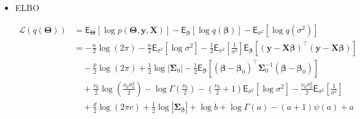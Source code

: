 \begin{appendix}
\begin{itemize}
where

\begin{equation}
a = \frac{n + \nu_0}{2}
\end{equation}

and

\begin{equation}
b = \frac{\nu_0 \sigma_0^2 + \mathsf{E}_{\bm{\beta}}\left[(\bm{y} - \bm{X} \bm{\beta})^{\top}
(\bm{y} - \bm{X} \bm{\beta})  \right]}{2}
\end{equation}

\item ELBO

\begin{equation}
\begin{split}
\mathcal{L}(q(\bm{\Theta})) 
&=\mathsf{E}_{\bm{\Theta}}\left[\log p(\bm{\Theta},\bm{y}, \bm{X})\right]-\mathsf{E}_{\bm{\beta}}\left[\log q(\bm{\beta})\right]-\mathsf{E}_{\sigma^2}\left[\log q(\sigma^2)\right]\\
&=-\frac{n}{2}\log(2\pi) - \frac{n}{2}\mathsf{E}_{\sigma^2}\left[\log\sigma^{2}\right]
- \frac{1}{2}\mathsf{E}_{\sigma^2}\left[\frac{1}{\sigma^{2}}\right]\mathsf{E}_{\bm{\beta}}\left[
(\bm y-\bm X\bm\beta)^{\top}
(\bm y-\bm X\bm\beta)\right]\\
&\quad - \frac{p}{2}\log(2\pi) + \frac{1}{2}\log|\bm\Sigma_{0}|
- \frac{1}{2}
\mathsf{E}_{\bm{\beta}}\left[(\bm\beta-\bm\beta_{0})^{\top}
\bm\Sigma_{0}^{-1}(\bm\beta-\bm\beta_{0})\right]\\
&\quad + \frac{\nu_{0}}{2}\log \left(\frac{\nu_0\sigma_{0}^2}{2}\right) - \log\Gamma\left(\frac{\nu_{0}}{2}\right)
- \left(\frac{\nu_{0}}{2}+1\right)\mathsf{E}_{\sigma^2}\left[\log\sigma^{2}\right]
- \frac{\nu_0\sigma_{0}^2}{2}\mathsf{E}_{\sigma^2}\left[\frac{1}{\sigma^{2}}\right]\\
&\quad+\frac{d}{2}\log(2\pi e)+\frac{1}{2}\log|\bm{\Sigma}_{\bm{\beta}}|+\log b+\log\Gamma(a)-(a+1)\psi(a)+a
\end{split}
\end{equation}


\end{itemize}
\end{appendix}
